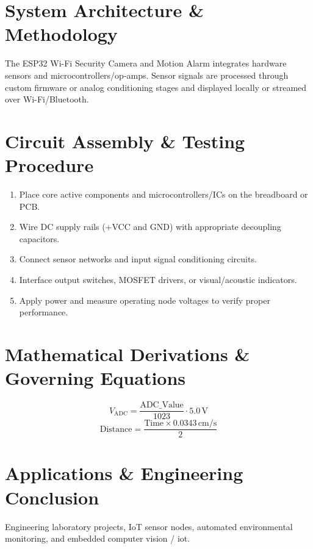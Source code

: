 \documentclass[11pt,a4paper]{article}
\begin{document}
\section{System Architecture \& Methodology}
The ESP32 Wi-Fi Security Camera and Motion Alarm integrates hardware sensors and microcontrollers/op-amps. Sensor signals are processed through custom firmware or analog conditioning stages and displayed locally or streamed over Wi-Fi/Bluetooth.

\section{Circuit Assembly \& Testing Procedure}
\begin{enumerate}
    \item Place core active components and microcontrollers/ICs on the breadboard or PCB.
    \item Wire DC supply rails (+VCC and GND) with appropriate decoupling capacitors.
    \item Connect sensor networks and input signal conditioning circuits.
    \item Interface output switches, MOSFET drivers, or visual/acoustic indicators.
    \item Apply power and measure operating node voltages to verify proper performance.
\end{enumerate}

\section{Mathematical Derivations \& Governing Equations}
\begin{equation}
V_{\text{ADC}} = \frac{\text{ADC\_Value}}{1023} \cdot 5.0\,\text{V}
\end{equation}
\begin{equation}
\text{Distance} = \frac{\text{Time} \times 0.0343\,\text{cm/s}}{2}
\end{equation}

\section{Applications \& Engineering Conclusion}
Engineering laboratory projects, IoT sensor nodes, automated environmental monitoring, and embedded computer vision / iot.
\end{document}
